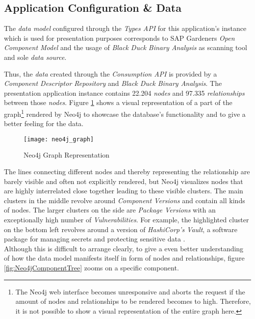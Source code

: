\subsection{Application Configuration \& Data}
The \emph{data model} configured through the \emph{Types API} for this application's instance which is used for presentation purposes corresponds to SAP Gardeners \emph{Open Component Model} and the usage of \emph{Black Duck Binary Analysis} as scanning tool and sole \emph{data source}.\par
Thus, the \emph{data} created through the \emph{Consumption API} is provided by a \emph{Component Descriptor Repository} and \emph{Black Duck Binary Analysis}. The presentation application instance contains 22.204 \emph{nodes} and 97.335 \emph{relationships} between those \emph{nodes}. Figure \ref{fig:Neo4jGraph} shows a visual representation of a part of the graph\footnote{The Neo4j web interface becomes unresponsive and aborts the request if the amount of nodes and relationships to be rendered becomes to high. Therefore, it is not possible to show a visual representation of the entire graph here.} rendered by Neo4j to showcase the database's functionality and to give a better feeling for the data.\par

\begin{figure}[H]
	\centering
	\texttt{[image: neo4j\_graph]}
	\caption[Neo4j Graph]{Neo4j Graph Representation }
	\label{fig:Neo4jGraph}
\end{figure}

The lines connecting different nodes and thereby representing the relationship are barely visible and often not explicitly rendered, but Neo4j visualizes nodes that are highly interrelated close together leading to these visible clusters. The main clusters in the middle revolve around \emph{Component Versions} and contain all kinds of nodes. The larger clusters on the side are \emph{Package Versions} with an exceptionally high number of \emph{Vulnerabilities}. For example, the highlighted cluster on the bottom left revolves around a version of \emph{HashiCorp's Vault}, a software package for managing secrets and protecting sensitive data \cite{vault}.\\

Although this is difficult to arrange clearly, to give a even better understanding of how the data model manifests itself in form of nodes and relationships, figure \ref{fig:Neo4jComponentTree} zooms on a specific component.

